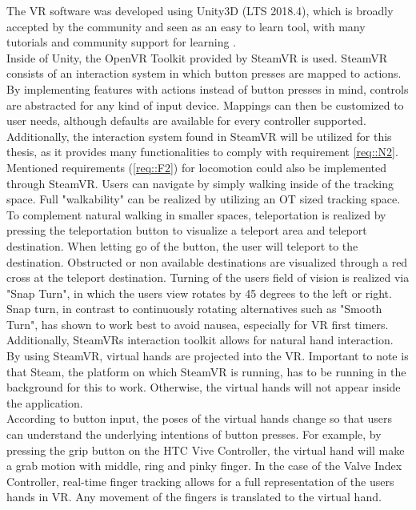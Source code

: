 The VR software was developed using Unity3D (LTS 2018.4), which is broadly accepted by the community and seen as an easy to learn tool, with many tutorials and community 
support for learning \cite{bartneck2015robot}.
\\ Inside of Unity, the OpenVR Toolkit provided by SteamVR is used.
SteamVR consists of an interaction system in which button presses are mapped to actions.
By implementing features with actions instead of button presses in mind, controls are abstracted for any kind of input device.
Mappings can then be customized to user needs, although defaults are available for every controller supported.
\\ Additionally, the interaction system found in SteamVR will be utilized for this thesis, as it provides many functionalities to comply with requirement \ref{req::N2}.
Mentioned requirements (\ref{req::F2}) for locomotion could also be implemented through SteamVR.
Users can navigate by simply walking inside of the tracking space.
Full "walkability" can be realized by utilizing an OT sized tracking space.
To complement natural walking in smaller spaces, teleportation is realized by pressing the teleportation button to visualize a teleport area and teleport destination.
When letting go of the button, the user will teleport to the destination.
Obstructed or non available destinations are visualized through a red cross at the teleport destination.
Turning of the users field of vision is realized via "Snap Turn", in which the users view rotates by 45 degrees to the left or right.
Snap turn, in contrast to continuously rotating alternatives such as "Smooth Turn", has shown to work best to avoid nausea, especially for VR first timers. 
\\ Additionally, SteamVRs interaction toolkit allows for natural hand interaction.
By using SteamVR, virtual hands are projected into the VR.
Important to note is that Steam, the platform on which SteamVR is running, has to be running in the background for this to work.
Otherwise, the virtual hands will not appear inside the application.
\\ According to button input, the poses of the virtual hands change so that users can understand the underlying intentions of button presses.
For example, by pressing the grip button on the HTC Vive Controller, the virtual hand will make a grab motion with middle, ring and pinky finger.
In the case of the Valve Index Controller, real-time finger tracking allows for a full representation of the users hands in VR.
Any movement of the fingers is translated to the virtual hand.
